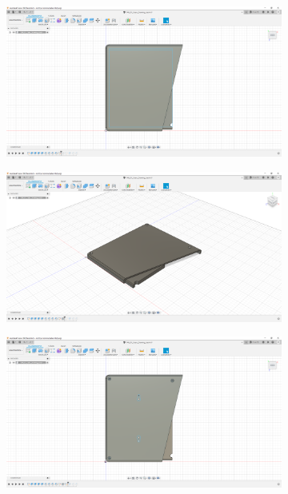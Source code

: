 \begin{figure}[h!tb]
\begin{subfigure}[t]{.3\linewidth}
		\caption[]{}
		\label{fig:design-back-09}
	\end{subfigure}
	\begin{subfigure}[t]{.3\linewidth}
		\includegraphics[width=\linewidth]{img/konstruktion_gehaeuse_hinten_010.png}
		\caption[]{}
		\label{fig:design-back-10}
	\end{subfigure}
	\begin{subfigure}[t]{.3\linewidth}
		\includegraphics[width=\linewidth]{img/konstruktion_gehaeuse_hinten_011.png}
		\caption[]{}
		\label{fig:design-back-11}
	\end{subfigure}
	\begin{subfigure}[t]{.3\linewidth}
		\includegraphics[width=\linewidth]{img/konstruktion_gehaeuse_hinten_012.png}

\end{subfigure}
\end{figure}
